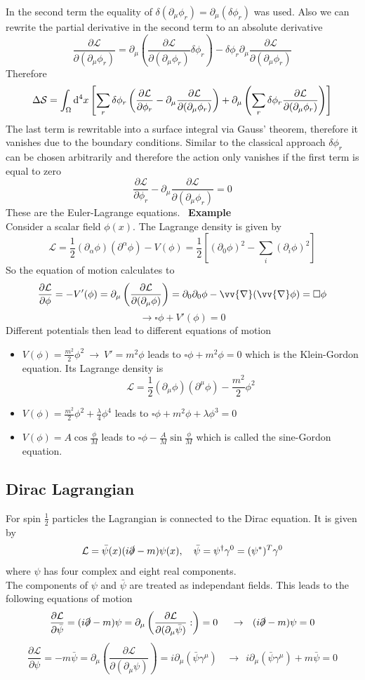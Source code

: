 \documentclass{include/thesisclass}
\newcommand{\LL}{\mathcal{L}}
\newcommand{\SSS}{\mathcal{S}}
\newcommand{\df}{\rightarrow}
\newcommand{\dd}{{\rm d}}
\newcommand{\p}{\partial}
\newcommand{\vn}{\vv{\nabla}}
\newcommand{\dslash}{\slashed{\partial}}
\newcommand{\sub}[1]{~\newline\newline\textbf{#1}\\}
\begin{document}
In the second term the equality of $\delta (\p _\mu \phi_r) = \p_\mu(\delta \phi_r)$ was used. Also we can rewrite the partial derivative in the second term to an absolute derivative
\[
\frac{\p \LL}{\p(\p_\mu \phi_r)} = \p_\mu \left( \frac{\p \LL}{\p ( \p_\mu \phi_r)} \delta\phi_r\right) - \delta \phi_r \p_\mu \frac{\p \LL}{\p(\p_\mu \phi_r)}
\]
Therefore
\[
\Delta \SSS = \int_\Omega \dd ^4 x \left[ \sum_r \delta \phi_r \left( \frac{\p \LL}{\p \phi_r} - \p_\mu \frac{\p \LL}{\p(\p_\mu \phi_r)}\right) + \p_\mu \left( \sum_r \delta \phi_r \frac{\p \LL}{\p(\p_\mu \phi_r)} \right)\right]
\]
The last term is rewritable into a surface integral via Gauss' theorem, therefore it vanishes due to the boundary conditions. Similar to the classical approach $\delta \phi_r$ can be chosen arbitrarily and therefore the action only vanishes if the first term is equal to zero
\[ 
\frac{\p \LL}{\p \phi_r} - \p_\mu \frac{\p \LL}{\p(\p_\mu \phi_r)} = 0
\]
These are the Euler-Lagrange equations.
\sub{Example}
Consider a scalar field $\phi(x)$. The Lagrange density is given by
\[ \LL = \frac{1}{2} (\p_\alpha \phi)(\p^\alpha \phi) - V(\phi) = \frac{1}{2} \left[ (\p_0\phi)^2 - \sum_i (\p_i \phi)^2\right]\]
So the equation of motion calculates to
\[ \frac{\p \LL}{\p \phi} = - V'(\phi) = \p_\mu \left( \frac{\p \LL}{\p(\p_\mu \phi)}\right) = \p_0 \p_0 \phi - \vn(\vn \phi) = \square \phi\]
\[\df \square \phi + V'(\phi) = 0\]
Different potentials then lead to different equations of motion
\begin{itemize}
\item $V(\phi) = \frac{m^2}{2}\phi^2 ~\df~ V' = m^2\phi$ leads to $\square\phi + m^2 \phi = 0$
which is the Klein-Gordon equation. Its Lagrange density is
\[ \LL = \frac{1}{2} (\p_\mu \phi)(\p^\mu \phi) - \frac{m^2}{2}\phi^2\]
\item $V(\phi) = \frac{m^2}{2}\phi^2 + \frac{\lambda}{4}\phi^4$ leads to $\square \phi + m^2 \phi + \lambda \phi^3  = 0$
\item $V(\phi) = A \cos \frac{\phi}{M}$ leads to $\square\phi - \frac{A}{M} \sin \frac{\phi}{M}$
which is called the sine-Gordon equation.
\end{itemize}

\subsection{Dirac Lagrangian}
For spin $\frac{1}{2}$ particles the Lagrangian is connected to the Dirac equation. It is given by
\[ \LL = \bar{\psi}(x)(i \dslash - m) \psi(x),~~~\bar{\psi} = \psi^\dagger \gamma^0 = (\psi^*)^T \gamma^0\]
where $\psi$ has four complex and eight real components.\\
The components of $\psi$ and $\bar{\psi}$ are treated as independant fields. This leads to the following equations of motion
\[ \frac{\p \LL}{\p \bar{\psi}} = ( i \dslash - m)\psi = \p_\mu \left( \frac{\p \LL}{\p(\p_\mu \bar{\psi})}:\right) = 0~~~~\df ~~ (i \dslash - m) \psi = 0\]
\[ \frac{\p\LL}{\p\psi} = -m \bar{\psi} = \p_\mu\left( \frac{\p\LL}{\p(\p_\mu \psi)}\right) = i \p_\mu(\bar{\psi}\gamma^\mu)~~~~\df ~~ i \p_\mu(\bar{\psi}\gamma^\mu) + m \bar{\psi} = 0\]
\end{document}
